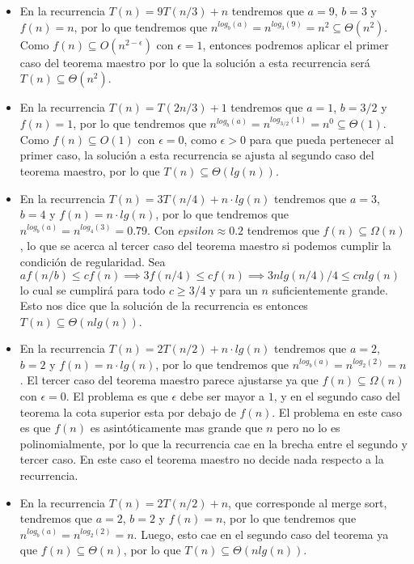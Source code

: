 \begin{itemize}
 \item En la recurrencia $T(n) = 9T(n/3) + n$ tendremos que $a=9$, $b=3$ y $f(n)=n$, por lo que tendremos que $n^{log_b(a)} = n^{log_3(9)} = n^2 \subseteq \Theta(n^2)$. Como $f(n) \subseteq O(n^{2-\epsilon})$ con $\epsilon = 1$, entonces podremos aplicar el primer caso del teorema maestro por lo que la soluci\'on a esta recurrencia ser\'a $T(n) \subseteq \Theta(n^2)$.

 \item En la recurrencia $T(n) = T(2n/3) + 1$ tendremos que $a=1$, $b=3/2$ y $f(n) = 1$, por lo que tendremos que $n^{log_b(a)} = n^{log_{3/2}(1)} = n^0 \subseteq \Theta(1)$. Como $f(n) \subseteq O(1)$ con $\epsilon = 0$, como $\epsilon > 0$ para que pueda pertenecer al primer caso, la soluci\'on a esta recurrencia se ajusta al segundo caso del teorema maestro, por lo que $T(n) \subseteq \Theta(lg(n))$.

 \item En la recurrencia $T(n) = 3T(n/4) + n \cdot lg(n)$ tendremos que $a=3$, $b=4$ y $f(n) = n \cdot lg(n)$, por lo que tendremos que $n^{log_b(a)} = n^{log_4(3)} = 0.79$. Con $epsilon \approx 0.2$ tendremos que $f(n) \subseteq \Omega(n)$, lo que se acerca al tercer caso del teorema maestro si podemos cumplir la condici\'on de regularidad. Sea $af(n/b) \leq cf(n) \implies 3f(n/4) \leq cf(n) \implies 3nlg(n/4)/4 \leq cnlg(n)$ lo cual se cumplir\'a para todo $c \geq 3/4$ y para un $n$ suficientemente grande. Esto nos dice que la soluci\'on de la recurrencia es entonces $T(n) \subseteq \Theta(nlg(n))$.

 \item En la recurrencia $T(n) = 2T(n/2) + n \cdot lg(n)$ tendremos que $a=2$, $b=2$ y $f(n) = n \cdot lg(n)$, por lo que tendremos que $n^{log_b(a)} = n^{log_2(2)} = n$. El tercer caso del teorema maestro parece ajustarse ya que $f(n) \subseteq \Omega(n)$ con $\epsilon = 0$. El problema es que $\epsilon$ debe ser mayor a $1$, y en el segundo caso del teorema la cota superior esta por debajo de $f(n)$. El problema en este caso es que $f(n)$ es asint\'oticamente mas grande que $n$ pero no lo es polinomialmente, por lo que la recurrencia cae en la brecha entre el segundo y tercer caso. En este caso el teorema maestro no decide nada respecto a la recurrencia.

 \item En la recurrencia $T(n) = 2T(n/2) + n$, que corresponde al merge sort, tendremos que $a=2$, $b=2$ y $f(n) = n$, por lo que tendremos que $n^{log_b(a)} = n^{log_2(2)} = n$. Luego, esto cae en el segundo caso del teorema ya que $f(n) \subseteq \Theta(n)$, por lo que $T(n) \subseteq \Theta(nlg(n))$.
\end{itemize}

